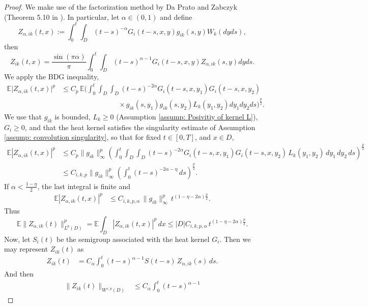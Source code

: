 \documentclass[12pt]{article}
\theoremstyle{definition}
\theoremstyle{remark}
\begin{document}
\begin{proof}
    We make use of the factorization method by Da Prato and Zabczyk (Theorem 5.10 in \cite{da2014stochastic}). In particular, let $\alpha \in (0,1)$ and define
\[
Z_{\alpha,ik}(t,x):= \int_0^t \int_D (t-s)^{-\alpha} G_i(t-s,x,y)g_{ik}(s,y)W_{k}(dy ds),
\]
then
\[
Z_{ik}(t,x) = \frac{\sin( \pi\alpha)}{\pi} \int_0^t \int_D (t-s)^{\alpha-1} G_i(t-s,x,y)Z_{\alpha,ik}(s,y)dyds.
\]
We apply the BDG inequality,
\begin{align*}
\mathbb{E}\lvert Z_{\alpha,ik}(t,x) \rvert^p
&\le C_p\, \mathbb{E}\Bigg(
\int_0^t \int_D\int_D (t-s)^{-2\alpha}
G_i(t-s,x,y_1) G_i(t-s,x,y_2) \\
&\qquad\qquad\qquad\qquad
\times g_{ik}(s,y_1) g_{ik}(s,y_2)
L_k(y_1,y_2)
dy_1dy_2ds
\Bigg)^{\frac{p}{2}}.
\end{align*}
We use that $g_{ik}$ is bounded, $L_k\geq 0$ (Assumption \ref{assump: Posivitiy of kernel L}), $G_i\geq 0$, and that the heat kernel satisfies the singularity estimate of Assumption \ref{assump: convolution singularity}, so that for fixed $t \in [0,T]$, and $x \in D$,
\begin{align*}
\mathbb E|Z_{\alpha,ik}(t,x)|^p&\le C_p \|g_{ik}\|_\infty^p
\left(
\int_0^t \int_D\int_D
(t-s)^{-2\alpha}G_i(t-s,x,y_1) G_i(t-s,x,y_2)\,
L_k(y_1,y_2)\,
dy_1\, dy_2\, ds
\right)^{\frac{p}{2}} \\
&\le C_{i,k,p} \|g_{ik}\|_\infty^p
\left(
\int_0^t (t-s)^{-2\alpha - \eta}\, ds
\right)^{\frac{p}{2}}.
\end{align*}
If $\alpha < \frac{1-\eta}{2}$, the last integral is finite and
\begin{align*}
\mathbb E|Z_{\alpha,ik}(t,x)|^p&\le C_{i,k,p,\alpha}\, \|g_{ik}\|_\infty^p\, t^{(1-\eta-2\alpha)\frac{p}{2}}.
\end{align*}
Thus
\begin{equation}\label{eq: facorization L^p bound}
\mathbb{E}\|Z_{\alpha,ik}(t)\|_{L^p(D)}^p
= \mathbb{E}\int_D |Z_{\alpha,ik}(t,x)|^p\, dx
\le |D|C_{i,k,p,\alpha}\, t^{(1-\eta-2\alpha)\frac{p}{2}}.
\end{equation}
Now, let $S_i(t)$ be the semigroup associated with the heat kernel $G_i$. Then we may represent $Z_{ik}(t)$ as
\begin{align*}
Z_{ik}(t)
&= C_{\alpha} \int_0^t (t-s)^{\alpha-1} S(t-s)\, Z_{\alpha,ik}(s)\, ds.
\end{align*}
And then
\begin{align*}
\|Z_{ik}(t)\|_{W^{\varepsilon,p}(D)}
&\le C_{\alpha} \int_0^t (t-s)^{\alpha-1}

\end{align*}
\end{proof}
\end{document}
